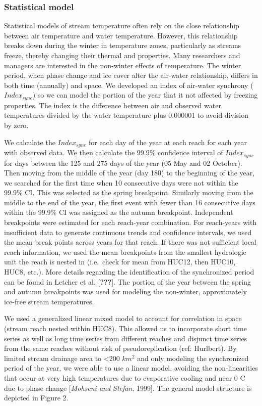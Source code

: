 \subsubsection{Statistical model}\label{statistical-model}

Statistical models of stream temperature often rely on the close
relationship between air temperature and water temperature. However,
this relationship breaks down during the winter in temperature zones,
particularly as streams freeze, thereby changing their thermal and
properties. Many researchers and managers are interested in the
non-winter effects of temperature. The winter period, when phase change
and ice cover alter the air-water relationship, differs in both time
(annually) and space. We developed an index of air-water synchrony
(\(Index_{sync}\)) so we can model the portion of the year that it not
affected by freezing properties. The index is the difference between air
and observed water temperatures divided by the water temperature plus
0.000001 to avoid division by zero.

We calculate the \(Index_{sync}\) for each day of the year at each reach
for each year with observed data. We then calculate the 99.9\%
confidence interval of \(Index_{sync}\) for days between the 125 and 275
days of the year (05 May and 02 October). Then moving from the middle of
the year (day 180) to the beginning of the year, we searched for the
first time when 10 consecutive days were not within the 99.9\% CI. This
was selected as the spring breakpoint. Similarly moving from the middle
to the end of the year, the first event with fewer than 16 consecutive
days within the 99.9\% CI was assigned as the autumn breakpoint.
Independent breakpoints were estimated for each reach-year combination.
For reach-years with insufficient data to generate continuous trends and
confidence intervals, we used the mean break points across years for
that reach. If there was not sufficient local reach information, we used
the mean breakpoints from the smallest hydrologic unit the reach is
nested in (i.e.~check for mean from HUC12, then HUC10, HUC8, etc.). More
details regarding the identification of the synchronized period can be
found in Letcher et al. {[}{\textbf{???}}{]}. The portion of the year
between the spring and autumn breakpoints was used for modeling the
non-winter, approximately ice-free stream temperatures.

We used a generalized linear mixed model to account for correlation in
space (stream reach nested within HUC8). This allowed us to incorporate
short time series as well as long time series from different reaches and
disjunct time series from the same reaches without risk of
pseudoreplication (ref: Hurlbert). By limited stream drainage area to
\textless{}200 \(km^2\) and only modeling the synchronized period of the
year, we were able to use a linear model, avoiding the non-linearities
that occur at very high temperatures due to evaporative cooling and near
0 C due to phase change {[}\emph{Mohseni and Stefan}, 1999{]}. The
general model structure is depicted in Figure 2.

